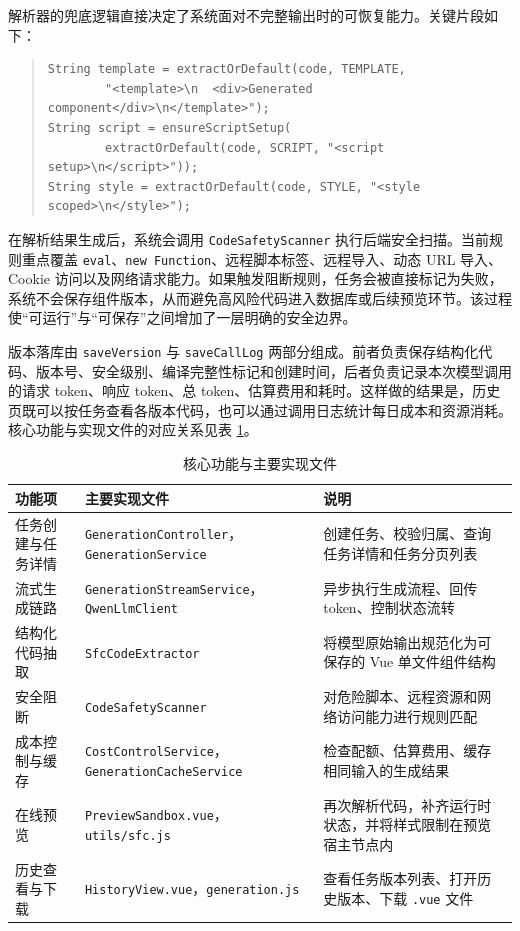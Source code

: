 解析器的兜底逻辑直接决定了系统面对不完整输出时的可恢复能力。关键片段如下：

\begin{quote}
\small
\begin{verbatim}
String template = extractOrDefault(code, TEMPLATE,
        "<template>\n  <div>Generated component</div>\n</template>");
String script = ensureScriptSetup(
        extractOrDefault(code, SCRIPT, "<script setup>\n</script>"));
String style = extractOrDefault(code, STYLE, "<style scoped>\n</style>");
\end{verbatim}
\end{quote}

在解析结果生成后，系统会调用 \texttt{CodeSafetyScanner} 执行后端安全扫描。当前规则重点覆盖 \texttt{eval}、\texttt{new Function}、远程脚本标签、远程导入、动态 URL 导入、Cookie 访问以及网络请求能力。如果触发阻断规则，任务会被直接标记为失败，系统不会保存组件版本，从而避免高风险代码进入数据库或后续预览环节。该过程使“可运行”与“可保存”之间增加了一层明确的安全边界。

版本落库由 \texttt{saveVersion} 与 \texttt{saveCallLog} 两部分组成。前者负责保存结构化代码、版本号、安全级别、编译完整性标记和创建时间，后者负责记录本次模型调用的请求 token、响应 token、总 token、估算费用和耗时。这样做的结果是，历史页既可以按任务查看各版本代码，也可以通过调用日志统计每日成本和资源消耗。核心功能与实现文件的对应关系见表 \ref{tab:chapter5-core}。

\begin{table}[!htbp]
\centering
\caption{核心功能与主要实现文件}
\label{tab:chapter5-core}
\small
\begin{tabular}{@{}p{}p{}p{}@{}}
\toprule
功能项 & 主要实现文件 & 说明 \\
\midrule
任务创建与任务详情 & \texttt{GenerationController}，\texttt{GenerationService} & 创建任务、校验归属、查询任务详情和任务分页列表 \\
流式生成链路 & \texttt{GenerationStreamService}，\texttt{QwenLlmClient} & 异步执行生成流程、回传 token、控制状态流转 \\
结构化代码抽取 & \texttt{SfcCodeExtractor} & 将模型原始输出规范化为可保存的 Vue 单文件组件结构 \\
安全阻断 & \texttt{CodeSafetyScanner} & 对危险脚本、远程资源和网络访问能力进行规则匹配 \\
成本控制与缓存 & \texttt{CostControlService}，\texttt{GenerationCacheService} & 检查配额、估算费用、缓存相同输入的生成结果 \\
在线预览 & \texttt{PreviewSandbox.vue}，\texttt{utils/sfc.js} & 再次解析代码，补齐运行时状态，并将样式限制在预览宿主节点内 \\
历史查看与下载 & \texttt{HistoryView.vue}，\texttt{generation.js} & 查看任务版本列表、打开历史版本、下载 \texttt{.vue} 文件 \\
\bottomrule
\end{tabular}
\end{table}

